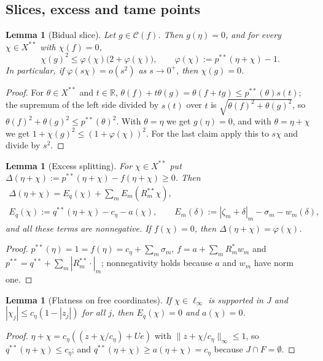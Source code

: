 \documentclass[10pt]{amsart}
\newtheorem{lemma}[theorem]{Lemma}
\theoremstyle{definition}
\theoremstyle{remark}
\newcommand{\R}{\mathbb R}
\newcommand{\Cset}{\mathcal C}
\begin{document}
\subsection{Slices, excess and tame points}

\begin{lemma}[Bidual slice]\label{lem:slice}
Let $g\in\Cset(f)$.  Then $g(\eta)=0$, and for every $\chi\in X^{**}$ with
$\chi(f)=0$,
\[
 \chi(g)^2\le\varphi(\chi)\big(2+\varphi(\chi)\big),\qquad
 \varphi(\chi):=p^{**}(\eta+\chi)-1 .
\]
In particular, if $\varphi(s\chi)=o(s^2)$ as $s\to0^+$, then $\chi(g)=0$.
\end{lemma}

\begin{proof}
For $\theta\in X^{**}$ and $t\in\R$,
$\theta(f)+t\theta(g)=\theta(f+tg)\le p^{**}(\theta)s(t)$; the supremum of the
left side divided by $s(t)$ over $t$ is $\sqrt{\theta(f)^2+\theta(g)^2}$, so
$\theta(f)^2+\theta(g)^2\le p^{**}(\theta)^2$.  With $\theta=\eta$ we get
$g(\eta)=0$, and with $\theta=\eta+\chi$ we get
$1+\chi(g)^2\le(1+\varphi(\chi))^2$.  For the last claim apply this to
$s\chi$ and divide by $s^2$.
\end{proof}

\begin{lemma}[Excess splitting]\label{lem:excess}
For $\chi\in X^{**}$ put
$\Delta(\eta+\chi):=p^{**}(\eta+\chi)-f(\eta+\chi)\ge0$.  Then
\begin{gather*}
 \Delta(\eta+\chi)=E_q(\chi)+\sum_mE_m(R_m^{**}\chi),\\
 E_q(\chi):=q^{**}(\eta+\chi)-c_\eta-a(\chi),\qquad
 E_m(\delta):=|\zeta_m+\delta|_m-\sigma_m-w_m(\delta),
\end{gather*}
and all these terms are nonnegative.  If $f(\chi)=0$, then
$\Delta(\eta+\chi)=\varphi(\chi)$.
\end{lemma}

\begin{proof}
$p^{**}(\eta)=1=f(\eta)=c_\eta+\sum_m\sigma_m$, $f=a+\sum_mR_m^*w_m$ and
$p^{**}=q^{**}+\sum_m|R_m^{**}\cdot|_m$; nonnegativity holds because $a$ and
$w_m$ have norm one.
\end{proof}

\begin{lemma}[Flatness on free coordinates]\label{lem:flat}
If $\chi\in\ell_\infty$ is supported in $J$ and $|\chi_j|\le
c_\eta(1-|z_j|)$ for all $j$, then $E_q(\chi)=0$ and $a(\chi)=0$.
\end{lemma}

\begin{proof}
$\eta+\chi=c_\eta((z+\chi/c_\eta)+Ue)$ with $\|z+\chi/c_\eta\|_\infty\le1$,
so $q^{**}(\eta+\chi)\le c_\eta$; and $q^{**}(\eta+\chi)\ge a(\eta+\chi)=
c_\eta$ because $J\cap F=\emptyset$.
\end{proof}
\end{document}
